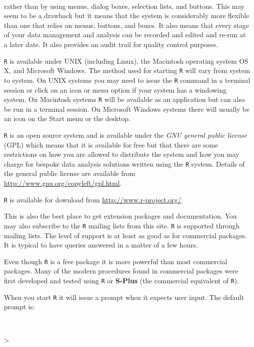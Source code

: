 \documentclass[
  12pt,
  a4paper]{book}
\newenvironment{Shaded}{\begin{snugshade}}{\end{snugshade}}
\newcommand{\SpecialCharTok}[1]{\textcolor[rgb]{0.00,0.00,0.00}{#1}}
\begin{document}
~

rather than by using menus, dialog boxes, selection lists, and buttons. This may seem to be a drawback but it means that the system is considerably more flexible than one that relies on menus, buttons, and boxes. It also means that every stage of your data management and analysis can be recorded and edited and re-run at a later date. It also provides an audit trail for quality control purposes.

\texttt{R} is available under UNIX (including Linux), the Macintosh operating system OS X, and Microsoft Windows. The method used for starting \texttt{R} will vary from system to system. On UNIX systems you may need to issue the \texttt{R} command in a terminal session or click on an icon or menu option if your system has a windowing system. On Macintosh systems \texttt{R} will be available as an application but can also be run in a terminal session. On Microsoft Windows systems there will usually be an icon on the Start menu or the desktop.

\texttt{R} is an open source system and is available under the \emph{GNU general public license} (GPL) which means that it is available for free but that there are some restrictions on how you are allowed to distribute the system and how you may charge for bespoke data analysis solutions written using the \texttt{R} system. Details of the general public license are available from \url{http://www.gnu.org/copyleft/gpl.html}.

\texttt{R} is available for download from \url{http://www.r-project.org/}.

This is also the best place to get extension packages and documentation. You may also subscribe to the \texttt{R} mailing lists from this site. \texttt{R} is supported through mailing lists. The level of support is at least as good as for commercial packages. It is typical to have queries answered in a matter of a few hours.

Even though \texttt{R} is a free package it is more powerful than most commercial packages. Many of the modern procedures found in commercial packages were first developed and tested using \texttt{R} or \textbf{S-Plus} (the commercial equivalent of \texttt{R}).

When you start \texttt{R} it will issue a prompt when it expects user input. The default prompt is:

~

\begin{Shaded}
\begin{Highlighting}[]
\SpecialCharTok{\textgreater{}}
\end{Highlighting}
\end{Shaded}
\end{document}
